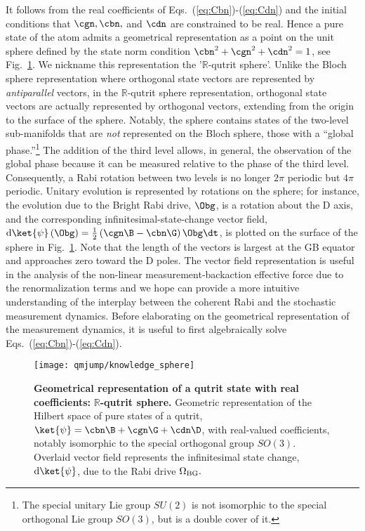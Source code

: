 It follows from the real coefficients of Eqs.~(\ref{eq:Cbn})-(\ref{eq:Cdn})
and the initial conditions that $\cgn,\cbn,$ and $\cdn$ are constrained
to be real. Hence a pure state of the atom admits a geometrical representation
as a point on the unit sphere defined by the state norm condition
$\cbn^{2}+\cgn^{2}+\cdn^{2}=1$, see Fig.~\ref{fig:R-qutrit-sphere-representation.}.
We nickname this representation the '$\mathbb{R}$-qutrit sphere'.
Unlike the Bloch sphere representation where orthogonal state vectors
are represented by \emph{antiparallel} vectors, in the $\mathbb{R}$-qutrit
sphere representation, orthogonal state vectors are actually represented
by orthogonal vectors, extending from the origin to the surface of
the sphere. Notably, the sphere contains states of the two-level sub-manifolds
that are \emph{not} represented on the Bloch sphere, those with a
``global phase.''\footnote{The special unitary Lie group $SU(2)$ is not isomorphic to the special
orthogonal Lie group $SO(3)$, but is a double cover of it.} The addition of the third level allows, in general, the observation
of the global phase because it can be measured relative to the phase
of the third level. Consequently, a Rabi rotation between two levels
is no longer $2\pi$ periodic but $4\pi$ periodic.  Unitary evolution
is represented by rotations on the sphere; for instance, the evolution
due to the Bright Rabi drive, $\Obg$, is a rotation about the D axis,
and the corresponding infinitesimal-state-change vector field, $\mathrm{d}\ket{\psi}\left(\Obg\right)=\frac{1}{2}\left(\cgn\B-\cbn\G\right)\Obg\dt$,
is plotted on the surface of the sphere in Fig.~\ref{fig:R-qutrit-sphere-representation.}.
Note that the length of the vectors is largest at the GB equator and
approaches zero toward the D poles. The vector field representation
is useful in the analysis of the non-linear measurement-backaction
effective force  due to the renormalization terms and we hope can
provide a more intuitive understanding of the interplay between the
coherent Rabi and the stochastic measurement dynamics.  Before elaborating
on the geometrical representation of the measurement dynamics, it
is useful to first algebraically solve Eqs.~(\ref{eq:Cbn})-(\ref{eq:Cdn}).

\begin{figure}
\begin{centering}
\texttt{[image: qmjump/knowledge\_sphere]}
\par\end{centering}
\caption[Geometrical representation of a qutrit state with real coefficients:\textbf{
$\mathbb{\mathbb{R}}$}-qutrit sphere]{\label{fig:R-qutrit-sphere-representation.}\textbf{Geometrical representation
of a qutrit state with real coefficients:} $\mathbb{\mathbb{R}}$\textbf{-qutrit
sphere. }Geometric representation of the Hilbert space of pure states
of a qutrit, $\ket{\psi}=\cbn\B+\cgn\G+\cdn\D$, with real-valued
coefficients, notably isomorphic to the special orthogonal group $SO\left(3\right)$.
Overlaid vector field represents the infinitesimal state change, $\mathrm{d}\ket{\psi}$,
due to the Rabi drive $\Omega_{{\rm BG}}.$}
\end{figure}


